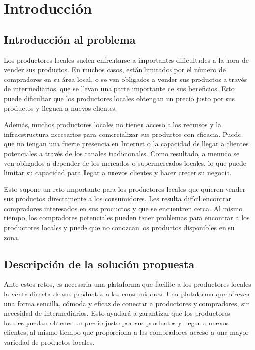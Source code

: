 
\chapter{Introducción}\label{cap1} %

\section{Introducción al problema}\label{sec:intro}

Los productores locales suelen enfrentarse a importantes dificultades a la hora de vender sus productos. En muchos casos, están limitados por el número de compradores en su área local, o se ven obligados a vender sus productos a través de intermediarios, que se llevan una parte importante de sus beneficios. Esto puede dificultar que los productores locales obtengan un precio justo por sus productos y lleguen a nuevos clientes.

Además, muchos productores locales no tienen acceso a los recursos y la infraestructura necesarios para comercializar sus productos con eficacia. Puede que no tengan una fuerte presencia en Internet o la capacidad de llegar a clientes potenciales a través de los canales tradicionales. Como resultado, a menudo se ven obligados a depender de los mercados o supermercados locales, lo que puede limitar su capacidad para llegar a nuevos clientes y hacer crecer su negocio.

Esto supone un reto importante para los productores locales que quieren vender sus productos directamente a los consumidores. Les resulta difícil encontrar compradores interesados en sus productos y que se encuentren cerca. Al mismo tiempo, los compradores potenciales pueden tener problemas para encontrar a los productores locales y puede que no conozcan los productos disponibles en su zona.

\section{Descripción de la solución propuesta}\label{sec:descripcion_solucion}

Ante estos retos, es necesaria una plataforma que facilite a los productores locales la venta directa de sus productos a los consumidores. Una plataforma que ofrezca una forma sencilla, cómoda y eficaz de conectar a productores y compradores, sin necesidad de intermediarios. Esto ayudará a garantizar que los productores locales puedan obtener un precio justo por sus productos y llegar a nuevos clientes, al mismo tiempo que proporciona a los compradores acceso a una mayor variedad de productos locales.

